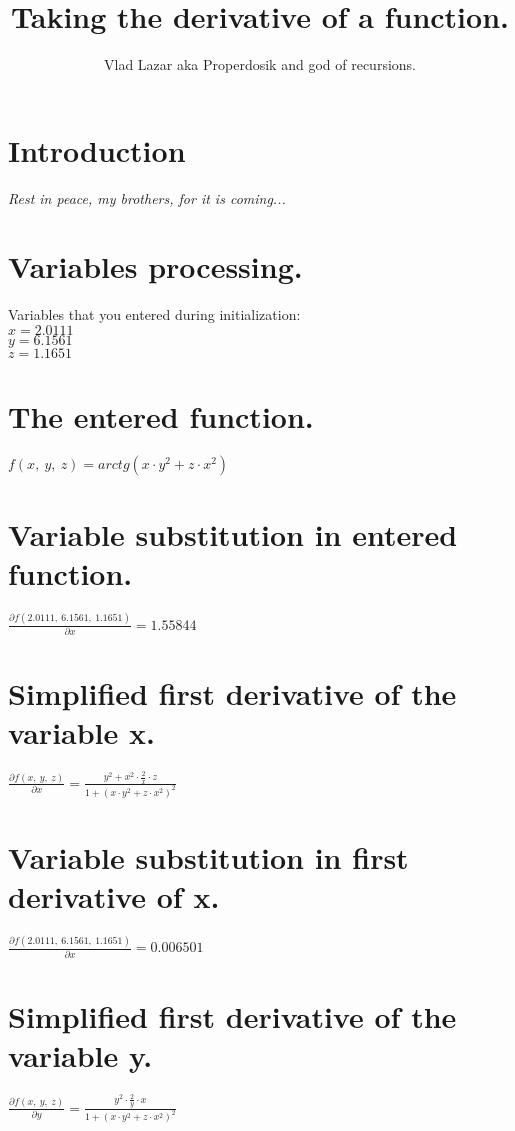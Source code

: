 \documentclass{article}
\title{\vspace{-1.0cm}\textbf{Taking the derivative of a function.}}
\author{Vlad Lazar aka Properdosik and god of recursions.}
\begin{document}
\maketitle
\section{Introduction}
\textit{Rest in peace, my brothers, for it is coming...}

\section{Variables processing.}
Variables that you entered during initialization:\\
$x = 2.0111$
\\$y = 6.1561$
\\$z = 1.1651$

\section{The entered function.}
$f(x,\ y,\ z) = arctg(x \cdot y^{2} + z \cdot x^{2})$

\section{Variable substitution in entered function.}
$\frac{\partial f(2.0111,\ 6.1561,\ 1.1651)}{\partial x} = 1.55844$

\section{Simplified first derivative of the variable x.}
$\frac{\partial f(x,\ y,\ z)}{\partial x} = \frac{y^{2} + x^{2} \cdot \frac{2}{x} \cdot z}{1 + (x \cdot y^{2} + z \cdot x^{2})^{2}}$

\section{Variable substitution in first derivative of x.}
$\frac{\partial f(2.0111,\ 6.1561,\ 1.1651)}{\partial x} = 0.006501$

\section{Simplified first derivative of the variable y.}
$\frac{\partial f(x,\ y,\ z)}{\partial y} = \frac{y^{2} \cdot \frac{2}{y} \cdot x}{1 + (x \cdot y^{2} + z \cdot x^{2})^{2}}$
\end{document}
